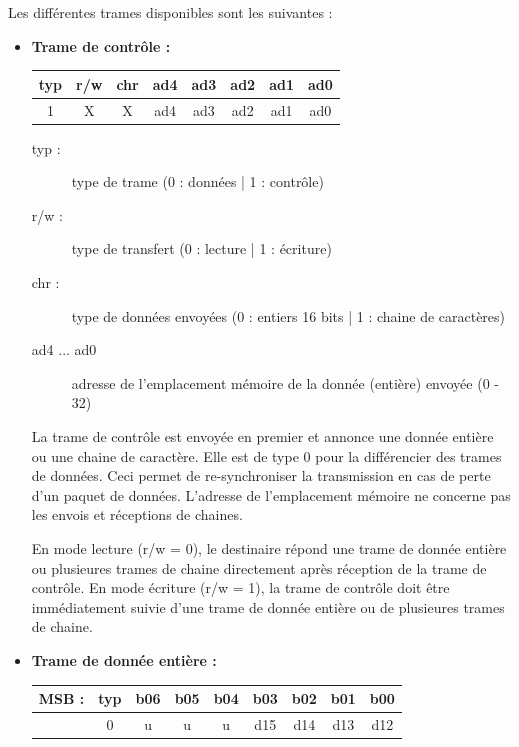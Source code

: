 \documentclass[11pt, french]{article} %
\begin{document}
\medskip
\noindent
Les différentes trames disponibles sont les suivantes :
\medskip
\begin{itemize}
	\item\textbf{ Trame de contrôle :} \\

		\begin{tabular} {|c|c|c|c|c|c|c|c|}
			\hline
			\textbf{typ} & \textbf{r/w} & \textbf{chr} & \textbf{ad4} & \textbf{ad3} & \textbf{ad2} & \textbf{ad1} & \textbf{ad0}\\
			\hline
			1 & X &  X &  ad4 &  ad3 &  ad2 &  ad1 &  ad0 \\ \hline
		\end{tabular}

		\begin{description}
			\item[typ :] type de trame (0 : données | 1 : contrôle)
			\item[r/w :] type de transfert (0 : lecture | 1 : écriture)
			\item[chr :] type de données envoyées (0 : entiers 16 bits | 1 : chaine de caractères)
			\item[ad4 ... ad0] adresse de l'emplacement mémoire de la donnée (entière) envoyée (0 - 32)
		\end{description}

		La trame de contrôle est envoyée en premier et annonce une donnée entière ou une chaine de caractère. Elle est de type 0 pour la différencier des trames de données. Ceci permet de re-synchroniser la transmission en cas de perte d'un paquet de données. L'adresse de l'emplacement mémoire ne concerne pas les envois et réceptions de chaines.

\medskip
		En mode lecture (r/w = 0), le destinaire répond une trame de donnée entière ou plusieures trames de chaine directement après réception de la trame de contrôle. En mode écriture (r/w = 1), la trame de contrôle doit être immédiatement suivie d'une trame de donnée entière ou de plusieures trames de chaine.


	\medskip
	\item\textbf{ Trame de donnée entière :} \\

		\begin{tabular} {|c|c|c|c|c|c|c|c|c|}
			\hline
			\textbf{MSB :} & \textbf{typ} & \textbf{b06} & \textbf{b05} & \textbf{b04} & \textbf{b03} & \textbf{b02} & \textbf{b01} & \textbf{b00}\\
			\hline
			 & 0 & u &  u &  u &  d15 &  d14 &  d13 &  d12 \\ \hline
		\end{tabular}


\end{itemize}
\end{document}
